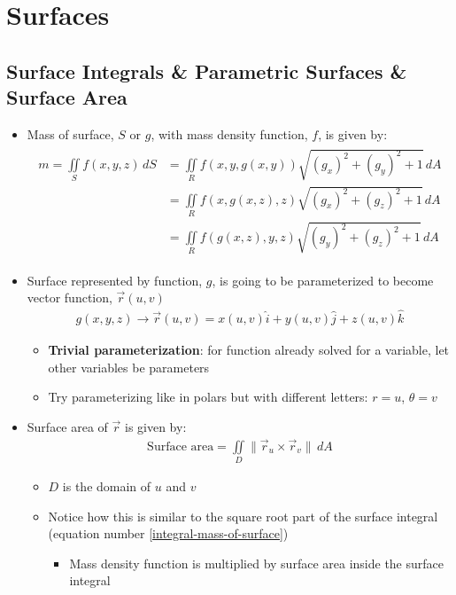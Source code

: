 \documentclass{article}
\begin{document}
\section{Surfaces}
\subsection{Surface Integrals \& Parametric Surfaces \& Surface Area}
\begin{itemize}
  \item Mass of surface, $S$ or $g$, with mass density function, $f$, is given by:
  \begin{align}
    \begin{split}
      m = \iint\limits_S f(x,y,z) \, dS &= \iint\limits_R f(x,y,g(x,y))\sqrt{(g_x)^2 + (g_y)^2 + 1} \, dA \\
      &= \iint\limits_R f(x,g(x,z),z)\sqrt{(g_x)^2 + (g_z)^2 + 1} \, dA \\
      &= \iint\limits_R f(g(x,z),y,z)\sqrt{(g_y)^2 + (g_z)^2 + 1} \, dA
    \end{split} \label{integral-mass-of-surface}
  \end{align}
  \item Surface represented by function, $g$, is going to be parameterized to become vector function, $\vec{r}(u,v)$
  \begin{align}
    g(x,y,z) \rightarrow \vec{r}(u,v) = x(u,v)\hat{i} + y(u,v)\hat{j} + z(u,v)\hat{k}
  \end{align}
  \begin{itemize}
    \item \textbf{Trivial parameterization}: for function already solved for a variable, let other variables be parameters
    \item Try parameterizing like in polars but with different letters: $r = u$, $\theta = v$
  \end{itemize}
  \item Surface area of $\vec{r}$ is given by:
  \begin{align}
    \textrm{Surface area} = \iint\limits_D \|\vec{r}_u \times \vec{r}_v\| \, dA
  \end{align}
  \begin{itemize}
    \item $D$ is the domain of $u$ and $v$
    \item Notice how this is similar to the square root part of the surface integral (equation number \ref{integral-mass-of-surface})
    \begin{itemize}
      \item Mass density function is multiplied by surface area inside the surface integral

\end{itemize}
\end{itemize}
\end{itemize}
\end{document}
